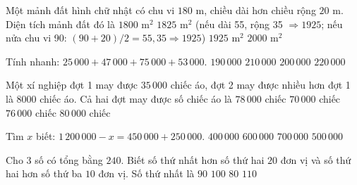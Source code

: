 \begin{ex} %
Một mảnh đất hình chữ nhật có chu vi $180\text{ m}$, chiều dài hơn chiều rộng $20\text{ m}$. Diện tích mảnh đất đó là
\choice
{$1800\text{ m}^2$}
{\True $1825\text{ m}^2$ (nếu dài 55, rộng 35 $\Rightarrow 1925$; nếu nửa chu vi 90: $(90+20)/2=55, 35 \Rightarrow 1925$)}
{$1925\text{ m}^2$}
{$2000\text{ m}^2$}
\end{ex}

\begin{ex} %
Tính nhanh: $25\,000 + 47\,000 + 75\,000 + 53\,000$.
\choice
{$190\,000$}
{$210\,000$}
{\True $200\,000$}
{$220\,000$}
\end{ex}

\begin{ex} %
Một xí nghiệp đợt 1 may được $35\,000$ chiếc áo, đợt 2 may được nhiều hơn đợt 1 là $8000$ chiếc áo. Cả hai đợt may được số chiếc áo là
\choice
{\True $78\,000$ chiếc}
{$70\,000$ chiếc}
{$76\,000$ chiếc}
{$80\,000$ chiếc}
\end{ex}

\begin{ex} %
Tìm $x$ biết: $1\,200\,000 - x = 450\,000 + 250\,000$.
\choice
{$400\,000$}
{$600\,000$}
{$700\,000$}
{\True $500\,000$}
\end{ex}

\begin{ex} %
Cho 3 số có tổng bằng $240$. Biết số thứ nhất hơn số thứ hai $20$ đơn vị và số thứ hai hơn số thứ ba $10$ đơn vị. Số thứ nhất là
\choice
{$90$}
{\True $100$}
{$80$}
{$110$}
\end{ex}

